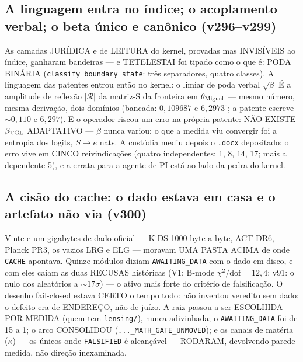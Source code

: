 \documentclass[11pt]{article}
\theoremstyle{definition}\newtheorem{deriv}{Derivação}
\begin{document}
\subsection*{A linguagem entra no \'indice; o acoplamento verbal; o beta \'unico e can\^onico (v296--v299)}As camadas JUR\'IDICA e de LEITURA do kernel, provadas mas INVIS\'IVEIS ao \'indice, ganharam bandeiras --- e TETELESTAI foi tipado como o que \'e: PODA BIN\'ARIA (\texttt{classify\_boundary\_state}: tr\^es separadores, quatro classes). A linguagem das patentes entrou ent\~ao no kernel: o limiar de poda verbal $\sqrt\beta$ \'E a amplitude de reflex\~ao $|\mathcal{R}|$ da matriz-S da fronteira em $\theta_{\rm Miguel}$ --- mesmo n\'umero, mesma deriva\c{c}\~ao, dois dom\'inios (bancada: $0{,}109687$ e $6{,}2973^\circ$; a patente escreve $\sim0{,}110$ e $6{,}297$). E o operador riscou um erro na pr\'opria patente: N\~AO EXISTE $\beta_{\rm TGL}$ ADAPTATIVO --- $\beta$ nunca variou; o que a medida viu convergir foi a entropia dos logits, $S\to e$ nats. A cust\'odia mediu depois o \texttt{.docx} depositado: o erro vive em CINCO reivindica\c{c}\~oes (quatro independentes: 1, 8, 14, 17; mais a dependente 5), e a errata para a agente de PI est\'a ao lado da pedra do kernel.

\subsection*{A cis\~ao do cache: o dado estava em casa e o artefato n\~ao via (v300)}Vinte e um gigabytes de dado oficial --- KiDS-1000 byte a byte, ACT DR6, Planck PR3, os vazios LRG e ELG --- moravam UMA PASTA ACIMA de onde \texttt{CACHE} apontava. Quinze m\'odulos diziam \texttt{AWAITING\_DATA} com o dado em disco, e com eles ca\'iam as duas RECUSAS hist\'oricas (V1: B-mode $\chi^2/\mathrm{dof}=12{,}4$; v91: o nulo dos aleat\'orios a ${\sim}17\sigma$) --- o ativo mais forte do crit\'erio de falsifica\c{c}\~ao. O desenho fail-closed estava CERTO o tempo todo: n\~ao inventou veredito sem dado; o defeito era de ENDERE\c{C}O, n\~ao de ju\'izo. A raiz passou a ser ESCOLHIDA POR MEDIDA (quem tem \texttt{lensing/}), nunca adivinhada; o \texttt{AWAITING\_DATA} foi de 15 a 1; o arco CONSOLIDOU (\texttt{...\_MATH\_GATE\_UNMOVED}); e os canais de mat\'eria ($\kappa$) --- os \'unicos onde \texttt{FALSIFIED} \'e alcan\c{c}\'avel --- RODARAM, devolvendo parede medida, n\~ao dire\c{c}\~ao inexaminada.
\end{document}
